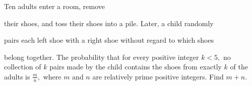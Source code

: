 Ten adults enter a room, remove 

their shoes, and toss their shoes into a pile. Later, a child randomly 

pairs each left shoe with a right shoe without regard to which shoes 

belong together. The probability that for every positive integer $k<5,$ no collection of $k$ pairs made by the child contains the shoes from exactly $k$ of the adults is $\tfrac{m}{n},$ where $m$ and $n$ are relatively prime positive integers. Find $m+n$.